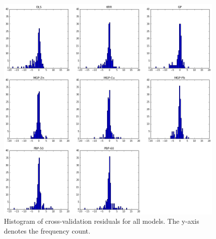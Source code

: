 \documentclass{article}
\begin{document}
\begin{figure}[!htbp]
    \centering
    \includegraphics[width=5in]{figures/model-residuals.png}
    \caption{Histogram of cross-validation residuals for all models. The y-axis denotes 
    the frequency count.}
    \label{residual}
\end{figure}
\end{document}

